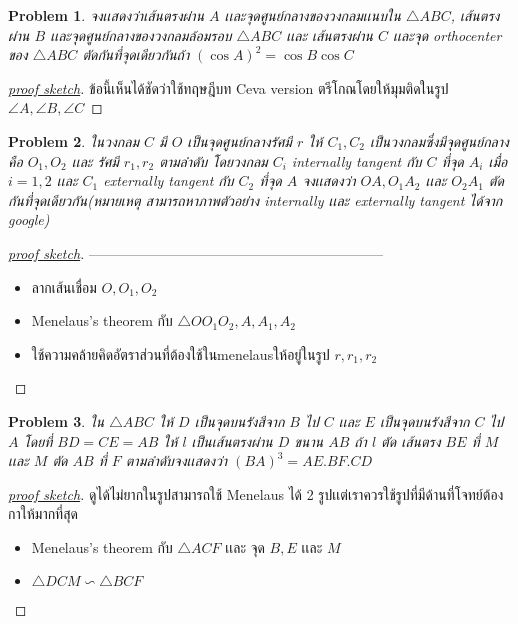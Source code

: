 \documentclass[a4paper,12pt]{article}
\newtheorem{problem}{Problem}[section]
\begin{document}
		\begin{problem}
			จงเเสดงว่าเส้นตรงผ่าน $A$ เเละจุดศูนย์กลางของวงกลมเเนบใน $\bigtriangleup{ABC}$, เส้นตรงผ่าน $B$ เเละจุดศูนย์กลางของวงกลมล้อมรอบ $\bigtriangleup{ABC}$ เเละ เส้นตรงผ่าน $C$ เเละจุด orthocenter ของ $\bigtriangleup{ABC}$ ตัดกันที่จุดเดียวกันถ้า $(\cos{A})^2 = \cos{B}\cos{C}$
		\end{problem}

		\begin{proof}[\underline{proof sketch}]
			ข้อนี้เห็นได้ชัดว่าใช้ทฤษฎีบท Ceva version ตรีโกณโดยให้มุมติดในรูป $\angle{A}, \angle{B}, \angle{C}$
		\end{proof}
		\begin{problem}
			ในวงกลม $C$ มี $O$ เป็นจุดศูนย์กลางรัศมี $r$ ให้ $C_1, C_2$ เป็นวงกลมซึ่งมีจุดศูนย์กลางคือ $O_1, O_2$ เเละ รัศมี $r_1, r_2$ ตามลำดับ โดยวงกลม $C_i$ internally tangent กับ $C$ ที่จุด $A_i$ เมื่อ $i =1,2$ เเละ $C_1$ externally tangent กับ $C_2$ ที่จุด $A$ จงเเสดงว่า $OA,O_1A_2$ เเละ $O_2A_1$ ตัดกันที่จุดเดียวกัน(หมายเหตุ สามารถหาภาพตัวอย่าง internally เเละ externally tangent ได้จาก google)
		\end{problem}
		\begin{proof}[\underline{proof sketch}]
			---------------------------------------------------------------
			\begin{itemize}
				\item ลากเส้นเชื่อม $O, O_1, O_2$ 
				\item  Menelaus's theorem กับ $\bigtriangleup{OO_1O_2}, A,A_1,A_2$
				\item ใช้ความคล้ายคิดอัตราส่วนที่ต้องใช้ในmenelausให้อยู่ในรูป $r,r_1,r_2$ 
			\end{itemize}
		\end{proof}
		\begin{problem}
			ใน $\bigtriangleup{ABC}$ ให้ $D$ เป็นจุดบนรังสีจาก $B$ ไป $C$ เเละ $E$ เป็นจุดบนรังสีจาก $C$ ไป $A$ โดยที่ $BD = CE = AB$ ให้ $l$ เป็นเส้นตรงผ่าน $D$ ขนาน $AB$ ถ้า $l$ ตัด เส้นตรง $BE$ ที่ $M$ เเละ $M$ ตัด $AB$ ที่ $F$ ตามลำดับจงเเสดงว่า $(BA)^3=AE.BF.CD$ 
		\end{problem}
		\begin{proof}[\underline{proof sketch}]
			ดูได้ไม่ยากในรูปสามารถใช้ Menelaus ได้ 2 รูปเเต่เราควรใช้รูปที่มีด้านที่โจทย์ต้องกาให้มากที่สุด
			\begin{itemize}
				\item Menelaus's theorem กับ $\bigtriangleup{ACF}$ เเละ จุด $B, E$ เเละ $M$
				\item $\bigtriangleup{DCM} \backsim \bigtriangleup{BCF}$
			\end{itemize}

		\end{proof}
\end{document}
